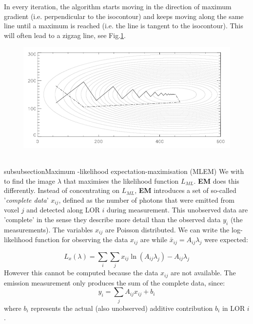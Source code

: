 \documentclass{article}
\begin{document}
In every iteration, the algorithm starts moving in the direction of maximum gradient (i.e. perpendicular to the isocontour)  and keeps moving along the same line until a maximum is reached (i.e. the line is tangent to the isocontour). This will often lead to a zigzag line, see Fig.\ref{Fig.isocontourzigzag}.
\begin{figure}
\centering
	\includegraphics[width=\linewidth]{Background Reading Analysis/IsocontourZigZag.png}
    \caption{\label{Fig.isocontourzigzag}}
\end{figure}





\\subsubsection{Maximum -likelihood expectation-maximisation (MLEM)}
We with to find the image $\lambda$ that maximises the likelihood function $L_{ML}$. \textbf{EM} does this differently. Instead of concentrating on $L_{ML}$, \textbf{EM} introduces a set of so-called '\textit{complete data}' $x_{ij}$, defined as the number of photons that were emitted from voxel $j$ and detected along LOR $i$ during measurement. This unobserved data are 'complete' in the sense they describe more detail than the observed data $y_i$ (the measurements). The variables $x_{ij}$ are Poisson distributed. We can write the log-likelihood function for observing the data $x_{ij}$ are while $\bar{x}_{ij} = A_{ij}\lambda_j$ were expected:

\begin{equation} \label{eq.log-likelihood_x}
L_x(\lambda) = \sum_i \sum_j x_{ij} \ln (A_{ij} \lambda_j) - A_{ij}\lambda_j
\end{equation}
However this cannot be computed because the data $x_{ij}$ are not available. The emission measurement only produces the sum of the complete data, since:
\begin{equation} \label{eq.project_x}
y_i = \sum_j A_{ij} x_{ij} + b_i
\end{equation}
where $b_i$ represents the actual (also unobserved) additive contribution $b_i$ in LOR $i$.
\end{document}
